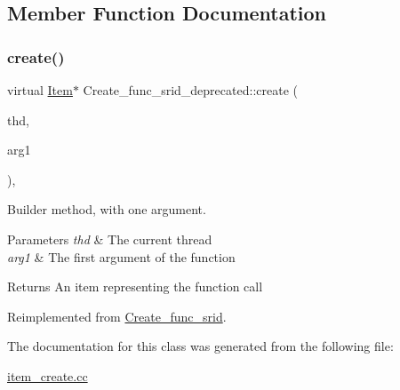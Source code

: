 \subsection{Member Function Documentation}
\mbox{\label{classCreate__func__srid__deprecated_aab48858db4cb1dc7a693b7f1d18939ac}} 
\subsubsection{\texorpdfstring{create()}{create()}}
{\footnotesize\ttfamily virtual \mbox{\hyperlink{classItem}{Item}}$\ast$ Create\+\_\+func\+\_\+srid\+\_\+deprecated\+::create (\begin{DoxyParamCaption}\item[{T\+HD $\ast$}]{thd,  }\item[{\mbox{\hyperlink{classItem}{Item}} $\ast$}]{arg1 }\end{DoxyParamCaption})\hspace{0.3cm}{\ttfamily [inline]}, {\ttfamily [virtual]}}

Builder method, with one argument. 
\begin{DoxyParams}{Parameters}
{\em thd} & The current thread \\
\hline
{\em arg1} & The first argument of the function \\
\hline
\end{DoxyParams}
\begin{DoxyReturn}{Returns}
An item representing the function call 
\end{DoxyReturn}


Reimplemented from \mbox{\hyperlink{classCreate__func__srid_a178db6ee641c938de060d692e426ac18}{Create\+\_\+func\+\_\+srid}}.



The documentation for this class was generated from the following file\+:\begin{DoxyCompactItemize}
\item 
\mbox{\hyperlink{item__create_8cc}{item\+\_\+create.\+cc}}\end{DoxyCompactItemize}
